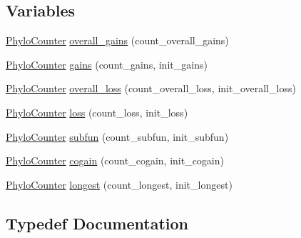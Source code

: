\subsection*{Variables}
\begin{DoxyCompactItemize}
\item 
\hyperlink{namespacebarray_1_1counters_1_1phylo_a89311b835ee762505a62d6cadbd6704b}{Phylo\+Counter} \hyperlink{namespacebarray_1_1counters_1_1phylo_acea59b0d741437e337b0f6bc39d4315a}{overall\+\_\+gains} (count\+\_\+overall\+\_\+gains)
\item 
\hyperlink{namespacebarray_1_1counters_1_1phylo_a89311b835ee762505a62d6cadbd6704b}{Phylo\+Counter} \hyperlink{namespacebarray_1_1counters_1_1phylo_a336b5016496abb570c383526a012cb48}{gains} (count\+\_\+gains, init\+\_\+gains)
\item 
\hyperlink{namespacebarray_1_1counters_1_1phylo_a89311b835ee762505a62d6cadbd6704b}{Phylo\+Counter} \hyperlink{namespacebarray_1_1counters_1_1phylo_ae75fded75a0c3141e188018c887381e1}{overall\+\_\+loss} (count\+\_\+overall\+\_\+loss, init\+\_\+overall\+\_\+loss)
\item 
\hyperlink{namespacebarray_1_1counters_1_1phylo_a89311b835ee762505a62d6cadbd6704b}{Phylo\+Counter} \hyperlink{namespacebarray_1_1counters_1_1phylo_ad79aa46e176e6191fb1652f9a13dedcb}{loss} (count\+\_\+loss, init\+\_\+loss)
\item 
\hyperlink{namespacebarray_1_1counters_1_1phylo_a89311b835ee762505a62d6cadbd6704b}{Phylo\+Counter} \hyperlink{namespacebarray_1_1counters_1_1phylo_ab4e266e94c45d5998c1b6645316f71e7}{subfun} (count\+\_\+subfun, init\+\_\+subfun)
\item 
\hyperlink{namespacebarray_1_1counters_1_1phylo_a89311b835ee762505a62d6cadbd6704b}{Phylo\+Counter} \hyperlink{namespacebarray_1_1counters_1_1phylo_a78228f029d2d6628916e9cead3c99417}{cogain} (count\+\_\+cogain, init\+\_\+cogain)
\item 
\hyperlink{namespacebarray_1_1counters_1_1phylo_a89311b835ee762505a62d6cadbd6704b}{Phylo\+Counter} \hyperlink{namespacebarray_1_1counters_1_1phylo_aca6c924c86a532ee99309016c285afa2}{longest} (count\+\_\+longest, init\+\_\+longest)
\end{DoxyCompactItemize}


\subsection{Typedef Documentation}
\mbox{\label{namespacebarray_1_1counters_1_1phylo_ad0fe3e98c998e8e43b227fd2e97a086c}} 
